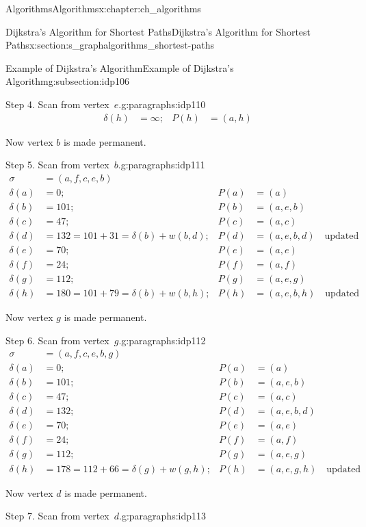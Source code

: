 \documentclass[oneside,10pt,]{book}
\numberwithin{equation}{section}
\newcommand{\amp}{&}
\begin{document}
\begin{chapterptx}{Algorithms}{}{Algorithms}{}{}{x:chapter:ch_algorithms}
\begin{sectionptx}{Dijkstra's Algorithm for Shortest Paths}{}{Dijkstra's Algorithm for Shortest Paths}{}{}{x:section:s_graphalgorithms_shortest-paths}
\begin{subsectionptx}{Example of Dijkstra's Algorithm}{}{Example of Dijkstra's Algorithm}{}{}{g:subsection:idp106}
\begin{paragraphs}{Step 4.  Scan from vertex~\(e\).}{g:paragraphs:idp110}
\begin{align*}
\delta(h)\amp=\infty; \amp P(h)\amp=(a,h)
\end{align*}
%
\par
Now vertex \(b\) is made permanent.%
\end{paragraphs}%
\begin{paragraphs}{Step 5.  Scan from vertex~\(b\).}{g:paragraphs:idp111}%
%
\begin{align*}
\sigma\amp=(a,f,c,e,b)\\
\delta(a)\amp=0; \amp P(a)\amp=(a)\\
\delta(b)\amp=101; \amp P(b)\amp=(a,e,b)\\
\delta(c)\amp=47; \amp P(c)\amp=(a,c)\\
\delta(d)\amp= 132 = 101+ 31= \delta(b)+w(b,d); \amp P(d)\amp=(a,e,b,d)\quad\text{updated} \\
\delta(e)\amp= 70; \amp P(e)\amp=(a,e)\\
\delta(f)\amp= 24; \amp P(f)\amp=(a,f)\\
\delta(g)\amp=112; \amp P(g)\amp=(a,e,g)\\
\delta(h)\amp=180 = 101+79=\delta(b)+w(b,h); \amp P(h)\amp=(a,e,b,h)\quad\text{updated} 
\end{align*}
%
\par
Now vertex \(g\) is made permanent.%
\end{paragraphs}%
\begin{paragraphs}{Step 6.  Scan from vertex~\(g\).}{g:paragraphs:idp112}%
%
\begin{align*}
\sigma\amp=(a,f,c,e,b,g)\\
\delta(a)\amp=0; \amp P(a)\amp=(a)\\
\delta(b)\amp=101; \amp P(b)\amp=(a,e,b)\\
\delta(c)\amp=47; \amp P(c)\amp=(a,c)\\
\delta(d)\amp= 132; \amp P(d)\amp=(a,e,b,d)\\
\delta(e)\amp=70; \amp P(e)\amp=(a,e)\\
\delta(f)\amp=24; \amp P(f)\amp=(a,f)\\
\delta(g)\amp=112; \amp P(g)\amp=(a,e,g)\\
\delta(h)\amp=178 = 112+66=\delta(g)+w(g,h); \amp P(h)\amp=(a,e,g,h)\quad\text{updated}
\end{align*}
%
\par
Now vertex \(d\) is made permanent.%
\end{paragraphs}%
\begin{paragraphs}{Step 7.  Scan from vertex~\(d\).}{g:paragraphs:idp113}%
%
\begin{align*}

\end{align*}
\end{paragraphs}
\end{subsectionptx}
\end{sectionptx}
\end{chapterptx}
\end{document}
